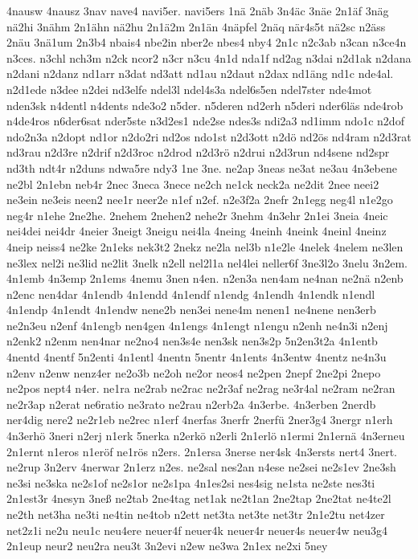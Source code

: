 {4nausw
4nausz
3nav
nave4
navi5er.
navi5ers
1nä
2näb
3n4äc
3näe
2n1äf
3näg
nä2hi
3nähm
2n1ähn
nä2hu
2n1ä2m
2n1än
4näpfel
2näq
när4s5t
nä2sc
n2äss
2näu
3nä1um
2n3b4
nbais4
nbe2in
nber2e
nbes4
nby4
2n1c
n2c3ab
n3can
n3ce4n
n3ces.
n3chl
nch3m
n2ck
ncor2
n3cr
n3cu
4n1d
nda1f
nd2ag
n3dai
n2d1ak
n2dana
n2dani
n2danz
nd1arr
n3dat
nd3att
nd1au
n2daut
n2dax
nd1äng
nd1c
nde4al.
n2d1ede
n3dee
n2dei
nd3elfe
ndel3l
ndel4s3a
ndel6s5en
ndel7ster
nde4mot
nden3sk
n4dentl
n4dents
nde3o2
n5der.
n5deren
nd2erh
n5deri
nder6läs
nde4rob
n4de4ros
n6der6sat
nder5ste
n3d2es1
nde2se
ndes3s
ndi2a3
nd1imm
ndo1c
n2dof
ndo2n3a
n2dopt
nd1or
n2do2ri
nd2os
ndo1st
n2d3ott
n2dö
nd2ös
nd4ram
n2d3rat
nd3rau
n2d3re
n2drif
n2d3roc
n2drod
n2d3rö
n2drui
n2d3run
nd4sene
nd2spr
nd3th
ndt4r
n2duns
ndwa5re
ndy3
1ne
3ne.
ne2ap
3neas
ne3at
ne3au
4n3ebene
ne2bl
2n1ebn
neb4r
2nec
3neca
3nece
ne2ch
ne1ck
neck2a
ne2dit
2nee
neei2
ne3ein
ne3eis
neen2
nee1r
neer2e
n1ef
n2ef.
n2e3f2a
2nefr
2n1egg
neg4l
n1e2go
neg4r
n1ehe
2ne2he.
2nehem
2nehen2
nehe2r
3nehm
4n3ehr
2n1ei
3neia
4neic
nei4dei
nei4dr
4neier
3neigt
3neigu
nei4la
4neing
4neinh
4neink
4neinl
4neinz
4neip
neiss4
ne2ke
2n1eks
nek3t2
2nekz
ne2la
nel3b
n1e2le
4nelek
4nelem
ne3len
ne3lex
nel2i
ne3lid
ne2lit
3nelk
n2ell
nel2l1a
nel4lei
neller6f
3ne3l2o
3nelu
3n2em.
4n1emb
4n3emp
2n1ems
4nemu
3nen
n4en.
n2en3a
nen4am
ne4nan
ne2nä
n2enb
n2enc
nen4dar
4n1endb
4n1endd
4n1endf
n1endg
4n1endh
4n1endk
n1endl
4n1endp
4n1endt
4n1endw
nene2b
nen3ei
nene4m
nenen1
ne4nene
nen3erb
ne2n3eu
n2enf
4n1engb
nen4gen
4n1engs
4n1engt
n1engu
n2enh
ne4n3i
n2enj
n2enk2
n2enm
nen4nar
ne2no4
nen3s4e
nen3sk
nen3s2p
5n2en3t2a
4n1entb
4nentd
4nentf
5n2enti
4n1entl
4nentn
5nentr
4n1ents
4n3entw
4nentz
ne4n3u
n2env
n2enw
nenz4er
ne2o3b
ne2oh
ne2or
neos4
ne2pen
2nepf
2ne2pi
2nepo
ne2pos
nept4
n4er.
ne1ra
ne2rab
ne2rac
ne2r3af
ne2rag
ne3r4al
ne2ram
ne2ran
ne2r3ap
n2erat
ne6ratio
ne3rato
ne2rau
n2erb2a
4n3erbe.
4n3erben
2nerdb
ner4dig
nere2
ne2r1eb
ne2rec
n1erf
4nerfas
3nerfr
2nerfü
2ner3g4
3nergr
n1erh
4n3erhö
3neri
n2erj
n1erk
5nerka
n2erkö
n2erli
2n1erlö
n1ermi
2n1ernä
4n3erneu
2n1ernt
n1eros
n1eröf
ne1rös
n2ers.
2n1ersa
3nerse
ner4sk
4n3ersts
nert4
3nert.
ne2rup
3n2erv
4nerwar
2n1erz
n2es.
ne2sal
nes2an
n4ese
ne2sei
ne2s1ev
2ne3sh
ne3si
ne3ska
ne2s1of
ne2s1or
ne2s1pa
4n1es2si
nes4sig
ne1sta
ne2ste
nes3ti
2n1est3r
4nesyn
3neß
ne2tab
2ne4tag
net1ak
ne2t1an
2ne2tap
2ne2tat
ne4te2l
ne2th
net3ha
ne3ti
ne4tin
ne4tob
n2ett
net3ta
net3te
net3tr
2n1e2tu
net4zer
net2z1i
ne2u
neu1c
neu4ere
neuer4f
neuer4k
neuer4r
neuer4s
neuer4w
neu3g4
2n1eup
neur2
neu2ra
neu3t
3n2evi
n2ew
ne3wa
2n1ex
ne2xi
5ney
}
